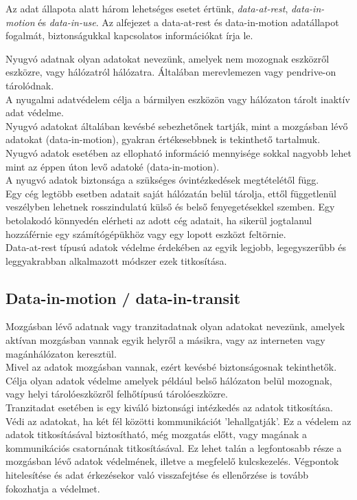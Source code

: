 
Az adat állapota alatt három lehetséges esetet értünk, \textit{data-at-rest}, \textit{data-in-motion} és \textit{data-in-use}. Az alfejezet a data-at-rest és data-in-motion \cite{varriale2016secube} adatállapot fogalmát, biztonságukkal kapcsolatos információkat írja le.


Nyugvó adatnak olyan adatokat nevezünk, amelyek nem mozognak eszközről eszközre, vagy hálózatról hálózatra. Általában merevlemezen vagy pendrive-on tárolódnak.
\vspace{5pt}\\A nyugalmi adatvédelem célja a bármilyen eszközön vagy hálózaton tárolt inaktív adat védelme.
\vspace{5pt}\\Nyugvó adatokat általában kevésbé sebezhetőnek tartják, mint a mozgásban lévő adatokat (data-in-motion), gyakran értékesebbnek is tekinthető tartalmuk. Nyugvó adatok esetében az ellopható információ mennyisége sokkal nagyobb lehet mint az éppen úton levő adatoké (data-in-motion).
\vspace{5pt}\\A nyugvó adatok biztonsága a szükséges óvintézkedések megtételétől függ.
\\Egy cég legtöbb esetben adatait saját hálózatán belül tárolja, ettől függetlenül veszélyben lehetnek rosszindulatú külső és belső fenyegetésekkel szemben. Egy betolakodó könnyedén elérheti az adott cég adatait, ha sikerül jogtalanul hozzáférnie egy számítógépükhöz vagy egy lopott eszközt feltörnie.
\vspace{5pt}\\Data-at-rest típusú adatok védelme érdekében az egyik legjobb, legegyszerűbb és leggyakrabban alkalmazott módszer ezek titkosítása.


\subsection{Data-in-motion / data-in-transit}

Mozgásban lévő adatnak vagy tranzitadatnak olyan adatokat nevezünk, amelyek aktívan mozgásban vannak egyik helyről a másikra, vagy az interneten vagy magánhálózaton keresztül.
\vspace{5pt}\\Mivel az adatok mozgásban vannak, ezért kevésbé biztonságosnak tekinthetők. Célja olyan adatok védelme amelyek például belső hálózaton belül mozognak, vagy helyi tárolóeszközről felhőtípusú tárolóeszközre.
\vspace{5pt}\\Tranzitadat esetében is egy kiváló biztonsági intézkedés az adatok titkosítása. Védi az adatokat, ha két fél közötti kommunikációt ’lehallgatják’.
Ez a védelem az adatok titkosításával biztosítható, még mozgatás előtt, vagy magának a kommunikációs csatornának titkosításával. Ez lehet talán a legfontosabb része a mozgásban lévő adatok védelmének, illetve a megfelelő kulcskezelés. Végpontok hitelesítése és adat érkezésekor való visszafejtése és ellenőrzése is tovább fokozhatja a védelmet. 


